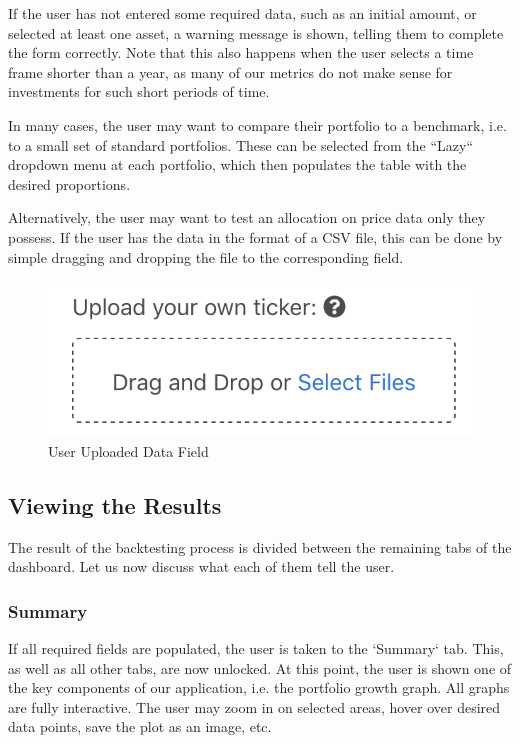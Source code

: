 \documentclass[main.tex]{subfiles}
\begin{document}
If the user has not entered some required data, such as an initial amount, or selected at least one asset, a warning message is shown, telling them to complete the form correctly. Note that this also happens when the user selects a time frame shorter than a year, as many of our metrics do not make sense for investments for such short periods of time.

In many cases, the user may want to compare their portfolio to a benchmark, i.e. to a small set of standard portfolios. These can be selected from the ``Lazy`` dropdown menu at each portfolio, which then populates the table with the desired proportions.

Alternatively, the user may want to test an allocation on price data only they possess. If the user has the data in the format of a CSV file, this can be done by simple dragging and dropping the file to the corresponding field.

\begin{figure}[H]
   \centering
   \includegraphics[scale=0.8]{08Appendices/081User/081Pictures/user_csv_alt.png}
   \caption{User Uploaded Data Field}
\end{figure}

\subsection{Viewing the Results}

The result of the backtesting process is divided between the remaining tabs of the dashboard. Let us now discuss what each of them tell the user.

\subsubsection{Summary}

If all required fields are populated, the user is taken to the `Summary` tab. This, as well as all other tabs, are now unlocked. At this point, the user is shown one of the key components of our application, i.e. the portfolio growth graph. All graphs are fully interactive. The user may zoom in on selected areas, hover over desired data points, save the plot as an image, etc.
\end{document}

